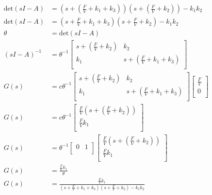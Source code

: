 \documentclass[12pt]{article}
\begin{document}
\begin{enumerate}
\begin{align*}
    \mathrm{det}(s I - A) &= \left(s + \left(\frac{F}{V} + k_1 + k_3\right)\right) \left(s + \left(\frac{F}{V} + k_2\right)\right) - k_1 k_2 \\
    \mathrm{det}(s I - A) &= \left(s + \frac{F}{V} + k_1 + k_3\right) \left(s + \frac{F}{V} + k_2\right) - k_1 k_2 \\
    \theta &= \mathrm{det}(s I - A) \\
    \left(s I - A\right)^{-1} &= \theta^{-1} \begin{bmatrix}
        s + \left(\frac{F}{V} + k_2\right) & k_2 \\
        k_1 & s + \left(\frac{F}{V} + k_1 + k_3\right) \\
    \end{bmatrix} \\
    G(s) &= c \theta^{-1} \begin{bmatrix}
        s + \left(\frac{F}{V} + k_2\right) & k_2 \\
        k_1 & s + \left(\frac{F}{V} + k_1 + k_3\right) \\
    \end{bmatrix} \begin{bmatrix}
        \frac{F}{V} \\
        0 \\
    \end{bmatrix} \\
    G(s) &= c \theta^{-1} \begin{bmatrix}
        \frac{F}{V} \left(s + \left(\frac{F}{V} + k_2\right)\right) \\
        \frac{F}{V} k_1 \\
    \end{bmatrix} \\
    G(s) &= \theta^{-1} \begin{bmatrix}
        0 & 1 \\
    \end{bmatrix} \begin{bmatrix}
        \frac{F}{V} \left(s + \left(\frac{F}{V} + k_2\right)\right) \\
        \frac{F}{V} k_1 \\
    \end{bmatrix} \\
    G(s) &= \frac{\frac{F}{V} k_1}{\theta} \\
    G(s) &= \frac{\frac{F}{V} k_1}{\left(s + \frac{F}{V} + k_1 + k_3\right) \left(s + \frac{F}{V} + k_2\right) - k_1 k_2}
\end{align*}



\end{enumerate}
\end{document}

